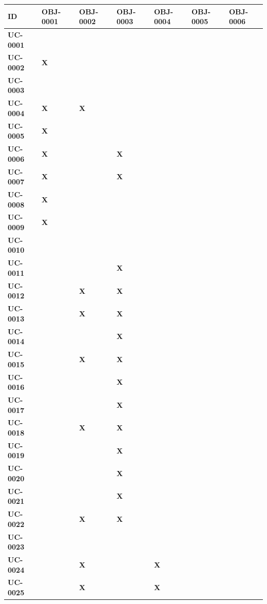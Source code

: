 \begin{table}[H]
\centering
\small
\begin{tabular}{p{1.5cm}p{0.5cm}p{0.5cm}p{0.5cm}p{0.5cm}p{0.5cm}p{0.5cm}}
\hline
\textbf{ID} & \textbf{OBJ-0001} & \textbf{OBJ-0002} & \textbf{OBJ-0003} & \textbf{OBJ-0004} & \textbf{OBJ-0005} & \textbf{OBJ-0006} \\
\hline
\textbf{UC-0001} &  &  &  &  &  &  \\
\textbf{UC-0002} & \textbf{X} &  &  &  &  &  \\
\textbf{UC-0003} &  &  &  &  &  &  \\
\textbf{UC-0004} & \textbf{X} & \textbf{X} &  &  &  &  \\
\textbf{UC-0005} & \textbf{X} &  &  &  &  &  \\
\textbf{UC-0006} & \textbf{X} &  & \textbf{X} &  &  &  \\
\textbf{UC-0007} & \textbf{X} &  & \textbf{X} &  &  &  \\
\textbf{UC-0008} & \textbf{X} &  &  &  &  &  \\
\textbf{UC-0009} & \textbf{X} &  &  &  &  &  \\
\textbf{UC-0010} &  &  &  &  &  &  \\
\textbf{UC-0011} &  &  & \textbf{X} &  &  &  \\
\textbf{UC-0012} &  & \textbf{X} & \textbf{X} &  &  &  \\
\textbf{UC-0013} &  & \textbf{X} & \textbf{X} &  &  &  \\
\textbf{UC-0014} &  &  & \textbf{X} &  &  &  \\
\textbf{UC-0015} &  & \textbf{X} & \textbf{X} &  &  &  \\
\textbf{UC-0016} &  &  & \textbf{X} &  &  &  \\
\textbf{UC-0017} &  &  & \textbf{X} &  &  &  \\
\textbf{UC-0018} &  & \textbf{X} & \textbf{X} &  &  &  \\
\textbf{UC-0019} &  &  & \textbf{X} &  &  &  \\
\textbf{UC-0020} &  &  & \textbf{X} &  &  &  \\
\textbf{UC-0021} &  &  & \textbf{X} &  &  &  \\
\textbf{UC-0022} &  & \textbf{X} & \textbf{X} &  &  &  \\
\textbf{UC-0023} &  &  &  &  &  &  \\
\textbf{UC-0024} &  & \textbf{X} &  & \textbf{X} &  &  \\
\textbf{UC-0025} &  & \textbf{X} &  & \textbf{X} &  &  \\

\end{tabular}
\end{table}

